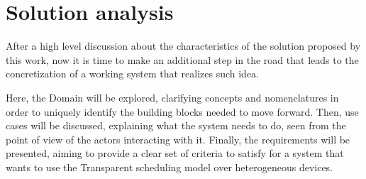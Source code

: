 \section{Solution analysis}
After a high level discussion about the characteristics of the solution proposed by this work, now it is time to make an additional step in the road that leads to the concretization of a working system that realizes such idea.

Here, the Domain will be explored, clarifying concepts and nomenclatures in order to uniquely identify the building blocks needed to move forward.
Then, use cases will be discussed, explaining what the system needs to do, seen from the point of view of the actors interacting with it.
Finally, the requirements will be presented, aiming to provide a clear set of criteria to satisfy for a system that wants to use the Transparent scheduling model over heterogeneous devices.

